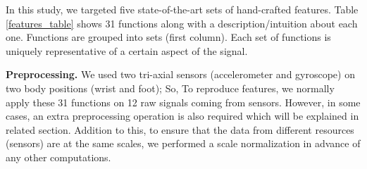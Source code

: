 \documentclass[journal,article,submit,moreauthors,pdftex]{Definitions/mdpi}
\begin{document}
In this study, we targeted five state-of-the-art sets of hand-crafted features. Table \ref{features_table} shows 31 functions along with a description/intuition about each one. Functions are grouped into sets (first column). Each set of functions is uniquely representative of a certain aspect of the signal.
 
\noindent\textbf{Preprocessing.} We used two tri-axial sensors (accelerometer and gyroscope) on two body positions (wrist and foot); So, To reproduce features, we normally apply these 31 functions on 12 raw signals coming from sensors. However, in some cases, an extra preprocessing operation is also required which will be explained in related section. Addition to this, to ensure that the data from different resources (sensors) are at the same scales, we performed a scale normalization in advance of any other computations.
\end{document}
